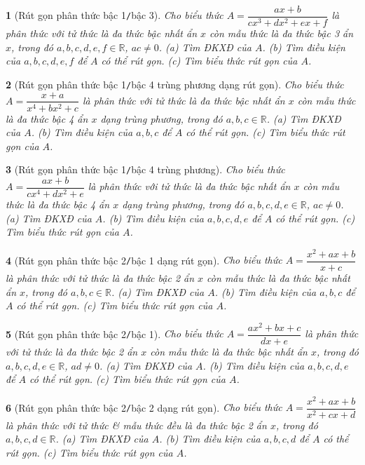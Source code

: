 \documentclass{article}
\newtheorem{baitoan}{}
\begin{document}
\begin{baitoan}[Rút gọn phân thức bậc 1{\tt/}bậc 3]
	Cho biểu thức $A = \dfrac{ax + b}{cx^3 + dx^2 + ex + f}$ là phân thức với tử thức là đa thức bậc nhất ẩn $x$ còn mẫu thức là đa thức bậc 3 ẩn $x$, trong đó $a,b,c,d,e,f\in\mathbb{R}$, $ac\ne0$. (a) Tìm {\rm ĐKXĐ} của $A$. (b) Tìm điều kiện của $a,b,c,d,e,f$ để $A$ có thể rút gọn. (c) Tìm biểu thức rút gọn của $A$.
\end{baitoan}

\begin{baitoan}[Rút gọn phân thức bậc 1{\tt/}bậc 4 trùng phương dạng rút gọn]
	Cho biểu thức $A = \dfrac{x + a}{x^4 + bx^2 + c}$ là phân thức với tử thức là đa thức bậc nhất ẩn $x$ còn mẫu thức là đa thức bậc 4 ẩn $x$ dạng trùng phương, trong đó $a,b,c\in\mathbb{R}$. (a) Tìm {\rm ĐKXĐ} của $A$. (b) Tìm điều kiện của $a,b,c$ để $A$ có thể rút gọn. (c) Tìm biểu thức rút gọn của $A$.
\end{baitoan}

\begin{baitoan}[Rút gọn phân thức bậc 1{\tt/}bậc 4 trùng phương]
	Cho biểu thức $A = \dfrac{ax + b}{cx^4 + dx^2 + e}$ là phân thức với tử thức là đa thức bậc nhất ẩn $x$ còn mẫu thức là đa thức bậc 4 ẩn $x$ dạng trùng phương, trong đó $a,b,c,d,e\in\mathbb{R}$, $ac\ne0$. (a) Tìm {\rm ĐKXĐ} của $A$. (b) Tìm điều kiện của $a,b,c,d,e$ để $A$ có thể rút gọn. (c) Tìm biểu thức rút gọn của $A$.
\end{baitoan}

\begin{baitoan}[Rút gọn phân thức bậc 2{\tt/}bậc 1 dạng rút gọn]
	Cho biểu thức $A = \dfrac{x^2 + ax + b}{x + c}$ là phân thức với tử thức là đa thức bậc 2 ẩn $x$ còn mẫu thức là đa thức bậc nhất ẩn $x$, trong đó $a,b,c\in\mathbb{R}$. (a) Tìm {\rm ĐKXĐ} của $A$. (b) Tìm điều kiện của $a,b,c$ để $A$ có thể rút gọn. (c) Tìm biểu thức rút gọn của $A$.
\end{baitoan}

\begin{baitoan}[Rút gọn phân thức bậc 2{\tt/}bậc 1]
	Cho biểu thức $A = \dfrac{ax^2 + bx + c}{dx + e}$ là phân thức với tử thức là đa thức bậc 2 ẩn $x$ còn mẫu thức là đa thức bậc nhất ẩn $x$, trong đó $a,b,c,d,e\in\mathbb{R}$, $ad\ne0$. (a) Tìm {\rm ĐKXĐ} của $A$. (b) Tìm điều kiện của $a,b,c,d,e$ để $A$ có thể rút gọn. (c) Tìm biểu thức rút gọn của $A$.
\end{baitoan}

\begin{baitoan}[Rút gọn phân thức bậc 2{\tt/}bậc 2 dạng rút gọn]
	Cho biểu thức $A = \dfrac{x^2 + ax + b}{x^2 + cx + d}$ là phân thức với tử thức \& mẫu thức đều là đa thức bậc 2 ẩn $x$, trong đó $a,b,c,d\in\mathbb{R}$. (a) Tìm {\rm ĐKXĐ} của $A$. (b) Tìm điều kiện của $a,b,c,d$ để $A$ có thể rút gọn. (c) Tìm biểu thức rút gọn của $A$.
\end{baitoan}
\end{document}

